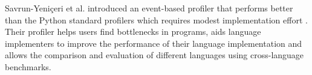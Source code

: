 Savrun-Yeni{\c{c}}eri et al. introduced an event-based profiler that performs better than the Python standard profilers which requires modest implementation effort \cite{savrun2015efficient}.
Their profiler helps users find bottlenecks in programs, aids language implementers to improve the performance of their language implementation and allows the comparison and evaluation of different languages using cross-language benchmarks.\\

